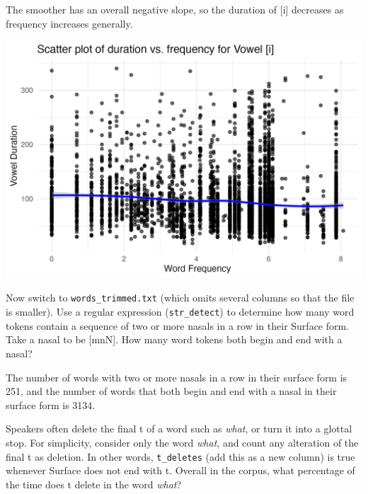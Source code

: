 \documentclass{../../templates/lkx_pset}
\begin{document}
The smoother has an overall negative slope, so the duration of [i] decreases as frequency increases generally.
\begin{center}
  \includegraphics[]{problem4.png}
\end{center}

\begin{problem}{5}
Now switch to \texttt{words\_trimmed.txt} (which omits several columns so that the file is smaller). Use a regular expression (\texttt{str\_detect}) to determine how many word tokens contain a sequence of two or more nasals in a row in their Surface form. Take a nasal to be [mnN]. How many word tokens both begin and end with a nasal?
\end{problem}

The number of words with two or more nasals in a row in their surface form is 251, and the number of words that both begin and end with a nasal in their surface form is 3134.

\begin{problem}{6}
Speakers often delete the final t of a word such as \textit{what}, or turn it into a glottal stop. For simplicity, consider only the word \textit{what}, and count any alteration of the final t as deletion. In other words, \texttt{t\_deletes} (add this as a new column) is true whenever Surface does not end with t. Overall in the corpus, what percentage of the time does t delete in the word \textit{what}?
\end{problem}
\end{document}
